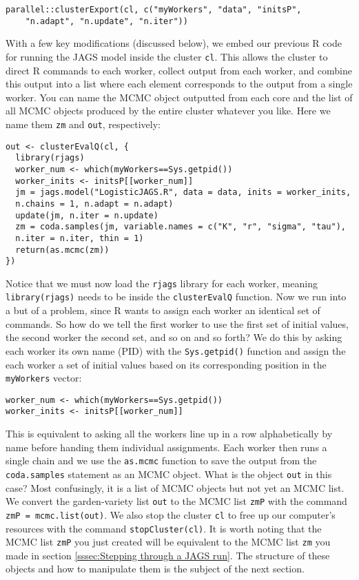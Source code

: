 \documentclass[12pt,english]{article}
\begin{document}
\begin{Verbatim}
parallel::clusterExport(cl, c("myWorkers", "data", "initsP", 
	"n.adapt", "n.update", "n.iter"))
\end{Verbatim}

\noindent With a few key modifications (discussed below), we embed our previous R code for running the JAGS model inside the cluster \texttt{cl}. This allows the cluster to direct R commands to each worker, collect output from each worker, and combine this output into a list where each element corresponds to the output from a single worker. You can name the MCMC object outputted from each core and the list of all MCMC objects produced by the entire cluster whatever you like. Here we name them \texttt{zm} and \texttt{out}, respectively:

\begin{Verbatim}
out <- clusterEvalQ(cl, {
  library(rjags)
  worker_num <- which(myWorkers==Sys.getpid())
  worker_inits <- initsP[[worker_num]]
  jm = jags.model("LogisticJAGS.R", data = data, inits = worker_inits, 
  n.chains = 1, n.adapt = n.adapt)
  update(jm, n.iter = n.update)
  zm = coda.samples(jm, variable.names = c("K", "r", "sigma", "tau"), 
  n.iter = n.iter, thin = 1)
  return(as.mcmc(zm))
}) 
\end{Verbatim}

\noindent Notice that we must now load the \texttt{rjags} library for each worker, meaning \texttt{library(rjags)} needs to be inside the \texttt{clusterEvalQ} function. Now we run into a but of a problem, since R wants to assign each worker an identical set of commands. So how do we tell the first worker to use the first set of initial values, the second worker the second set, and so on and so forth? We do this by asking each worker its own name (PID) with the \texttt{Sys.getpid()} function and assign the each worker a set of initial values based on its corresponding position in the \texttt{myWorkers} vector:

\begin{Verbatim}
worker_num <- which(myWorkers==Sys.getpid())
worker_inits <- initsP[[worker_num]]
\end{Verbatim} 
 
\noindent This is equivalent to asking all the workers line up in a row alphabetically by name before handing them individual assignments. Each worker then runs a single chain and we use the \texttt{as.mcmc} function to save the output from the \texttt{coda.samples} statement as an MCMC object. What is the object \texttt{out} in this case? Most confusingly, it is a list of MCMC objects but not yet an MCMC list. We convert the garden-variety list \texttt{out} to the MCMC list \texttt{zmP} with the command \texttt{zmP = mcmc.list(out)}.  We also stop the cluster \texttt{cl} to free up our computer's resources with the command \texttt{stopCluster(cl)}. It is worth noting that the MCMC list \texttt{zmP} you just created will be equivalent to the MCMC list \texttt{zm} you made in section \ref{sssec:Stepping through a JAGS run}. The structure of these objects and how to manipulate them is the subject of the next section.
\end{document}
